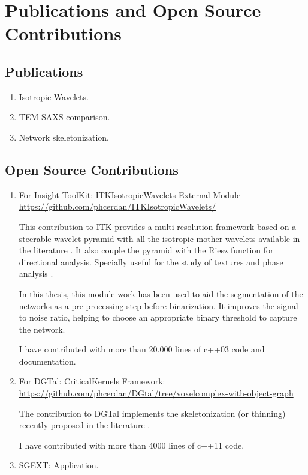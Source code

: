 \chapter{Publications and Open Source Contributions}

\label{Appendix-Contributions}


\section{Publications}

\begin{enumerate}[label=\bfseries\alph*)]
\item Isotropic Wavelets.
\item TEM-SAXS comparison.
\item Network skeletonization.
\end{enumerate}

\section{Open Source Contributions}

\begin{enumerate}[label=\bfseries\alph*)]
  \item For Insight ToolKit: ITKIsotropicWavelets External Module \url{https://github.com/phcerdan/ITKIsotropicWavelets/}

    This contribution to ITK provides a multi-resolution framework based on a steerable wavelet pyramid \cite{simoncelli_steerable_1995} with all the isotropic mother wavelets available in the literature \cite{held_steerable_2010, pad_vow:_2014}. It also couple the pyramid with the Riesz function \cite{chenouard_3d_2012} for directional analysis. Specially useful for the study of textures \cite{depeursinge_steerable_2017} and phase analysis \cite{held_steerable_2010}.

  In this thesis, this module work has been used to aid the segmentation of the networks as a pre-processing step before binarization. It improves the signal to noise ratio, helping to choose an appropriate binary threshold to capture the network.

  I have contributed with more than 20.000 lines of c++03 code and documentation.

  \item For DGTal: CriticalKernels Framework: \url{https://github.com/phcerdan/DGtal/tree/voxelcomplex-with-object-graph}

    The contribution to DGTal implements the skeletonization (or thinning) recently proposed in the literature \cite{couprie_3d_2015, bertrand_parallel_2017}.

  I have contributed with more than 4000 lines of c++11 code.
\item SGEXT: Application.
\end{enumerate}



